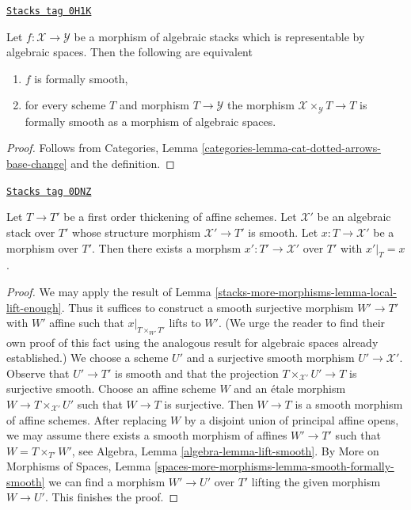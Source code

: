 \begin{lemma}
\label{stacks-more-morphisms-lemma-formal-smoothness-representable}
\href{https://stacks.math.columbia.edu/tag/0H1K}{\texttt{Stacks tag 0H1K}}

Let $f : \mathcal{X} \to \mathcal{Y}$ be a morphism of algebraic stacks
which is representable by algebraic spaces. Then the following are equivalent
\begin{enumerate}
\item $f$ is formally smooth,
\item for every scheme $T$ and morphism $T \to \mathcal{Y}$
the morphism $\mathcal{X} \times_\mathcal{Y} T \to T$
is formally smooth as a morphism of algebraic spaces.
\end{enumerate}
\end{lemma}

\begin{proof}
Follows from
Categories, Lemma \ref{categories-lemma-cat-dotted-arrows-base-change}
and the definition.
\end{proof}

\begin{lemma}
\label{stacks-more-morphisms-lemma-lift-to-smooth}
\href{https://stacks.math.columbia.edu/tag/0DNZ}{\texttt{Stacks tag 0DNZ}}

Let $T \to T'$ be a first order thickening of affine schemes.
Let $\mathcal{X}'$ be an algebraic stack over $T'$
whose structure morphism $\mathcal{X}' \to T'$ is smooth.
Let $x : T \to \mathcal{X}'$ be a morphism
over $T'$. Then there exists a morphsm $x' : T' \to \mathcal{X}'$
over $T'$ with $x'|_T = x$.
\end{lemma}

\begin{proof}
We may apply the result of Lemma \ref{stacks-more-morphisms-lemma-local-lift-enough}.
Thus it suffices to construct a smooth surjective morphism
$W' \to T'$ with $W'$ affine such that
$x|_{T \times_{W'} T'}$ lifts to $W'$.
(We urge the reader to find their own proof of this fact
using the analogous result for algebraic spaces already
established.) We choose a
scheme $U'$ and a surjective smooth morphism $U' \to \mathcal{X}'$.
Observe that $U' \to T'$ is smooth and that the projection
$T \times_{\mathcal{X}'} U' \to T$ is surjective smooth.
Choose an affine scheme $W$ and an \'etale morphism
$W \to T \times_{\mathcal{X}'} U'$ such that $W \to T$
is surjective. Then $W \to T$ is a smooth morphism of
affine schemes. After replacing $W$ by a disjoint union of
principal affine opens, we may assume there exists a
smooth morphism of affines $W' \to T'$ such that
$W = T \times_{T'} W'$, see Algebra, Lemma \ref{algebra-lemma-lift-smooth}.
By More on Morphisms of Spaces, Lemma
\ref{spaces-more-morphisms-lemma-smooth-formally-smooth}
we can find a morphism $W' \to U'$ over $T'$ lifting
the given morphism $W \to U'$. This finishes the proof.
\end{proof}

